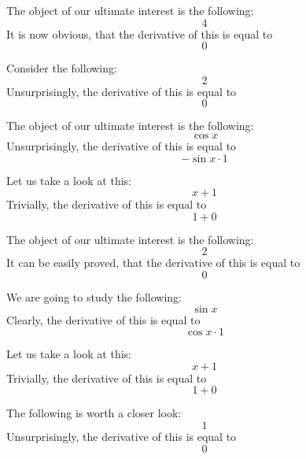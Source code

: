 \documentclass{article}
\begin{document}
The object of our ultimate interest is the following:
\begin{equation}
4 
\end{equation}
It is now obvious, that the derivative of this is equal to
\begin{equation}
0 
\end{equation}

Consider the following:
\begin{equation}
2 
\end{equation}
Unsurprisingly, the derivative of this is equal to
\begin{equation}
0 
\end{equation}

The object of our ultimate interest is the following:
\begin{equation}
\cos x 
\end{equation}
Unsurprisingly, the derivative of this is equal to
\begin{equation}
-\sin x \cdot 1 
\end{equation}

Let us take a look at this:
\begin{equation}
x + 1 
\end{equation}
Trivially, the derivative of this is equal to
\begin{equation}
1 + 0 
\end{equation}

The object of our ultimate interest is the following:
\begin{equation}
2 
\end{equation}
It can be easily proved, that the derivative of this is equal to
\begin{equation}
0 
\end{equation}

We are going to study the following:
\begin{equation}
\sin x 
\end{equation}
Clearly, the derivative of this is equal to
\begin{equation}
\cos x \cdot 1 
\end{equation}

Let us take a look at this:
\begin{equation}
x + 1 
\end{equation}
Trivially, the derivative of this is equal to
\begin{equation}
1 + 0 
\end{equation}

The following is worth a closer look:
\begin{equation}
1 
\end{equation}
Unsurprisingly, the derivative of this is equal to
\begin{equation}
0 
\end{equation}
\end{document}
